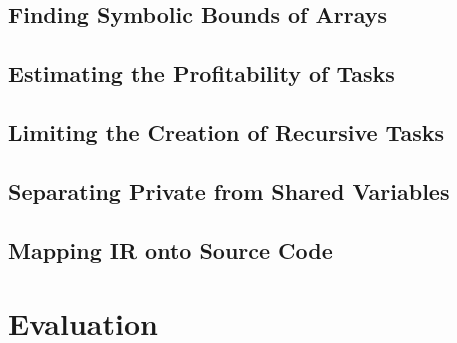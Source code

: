 \documentclass[sigplan,10pt,review,anonymous]{acmart}
\begin{document}
\subsection{Finding Symbolic Bounds of Arrays}
\label{sub:symb}

\subsection{Estimating the Profitability of Tasks}
\label{sub:profit}

\subsection{Limiting the Creation of Recursive Tasks}
\label{sub:rec}

\subsection{Separating Private from Shared Variables}
\label{sub:variance}

\subsection{Mapping IR onto Source Code}
\label{sub:ir}

\section{Evaluation}
\label{sec:eval}



\end{document}
